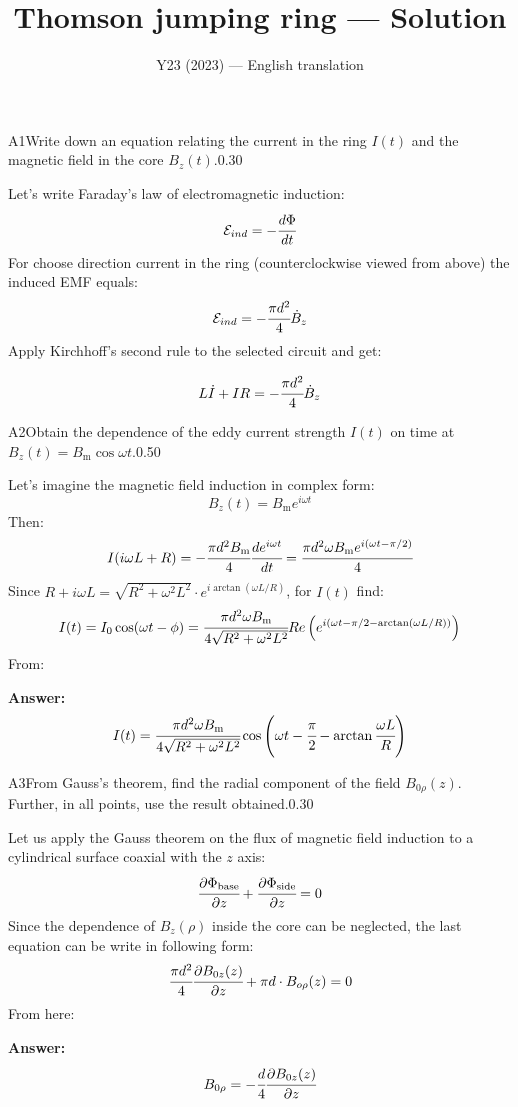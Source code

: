 \documentclass[11pt,a4paper]{article}
\title{\textbf{Thomson jumping ring --- Solution}}
\author{\normalsize Y23 (2023) — English translation}
\date{}
\begin{document}
\maketitle\vspace{-0.5em}
\begin{solcard}{A1}{Write down an equation relating the current in the ring $I(t)$ and the magnetic field in the core $B_z(t)$.}{0.30}

Let's write Faraday's law of electromagnetic induction: $$\mathcal{E}_{ind}=-\cfrac{d\Phi}{dt} $$For choose direction current in the ring (counterclockwise viewed from above) the induced EMF equals: $$\mathcal{E}_{ind}=-\cfrac{\pi{d}^2}{4}\dot{B}_z $$Apply Kirchhoff's second rule to the selected circuit and get:


$$L\dot{I}+IR=-\cfrac{\pi{d}^2}{4}\dot{B}_z $$

\end{solcard}

\begin{solcard}{A2}{Obtain the dependence of the eddy current strength $I(t)$ on time at $B_z(t)=B_\mathrm m\cos\omega t$.}{0.50}

Let's imagine the magnetic field induction in complex form: $$B_z(t)=B_\mathrm me^{i\omega t} $$Then: $$I(i\omega L+R)=-\cfrac{\pi{d}^2B_\mathrm m}{4}\cfrac{de^{i\omega t}}{dt}=\cfrac{\pi{d}^2\omega B_\mathrm me^{i(\omega t-\pi/2)}}{4} $$Since $R+i\omega L=\sqrt{R^2+\omega^2L^2}\cdot e^{i\arctan(\omega L/R)}$, for $I(t)$ find: $$I(t)=I_0\cos(\omega t-\phi)=\cfrac{\pi{d}^2\omega B_\mathrm m}{4\sqrt{R^2+\omega^2L^2}}Re\left(e^{i(\omega t-\pi/2-\arctan(\omega L/R))}\right) $$From:

\par\smallskip\noindent\textbf{Answer:} $$I(t)=\cfrac{\pi{d}^2\omega B_\mathrm m}{4\sqrt{R^2+\omega^2L^2}}\cos\left(\omega t-\cfrac{\pi}{2}-\arctan\cfrac{\omega L}{R}\right) $$
\end{solcard}

\begin{solcard}{A3}{From Gauss's theorem, find the radial component of the field $B_{0\rho}(z)$. Further, in all points, use the result obtained.}{0.30}

Let us apply the Gauss theorem on the flux of magnetic field induction to a cylindrical surface coaxial with the $z$ axis: $$\cfrac{\partial \Phi_\text{base}}{\partial z}+\cfrac{\partial \Phi_\text{side}}{\partial z}=0 $$Since the dependence of $B_z(\rho)$ inside the core can be neglected, the last equation can be write in following form: $$\cfrac{\pi{d}^2}{4}\cfrac{\partial B_{0z}(z)}{\partial z}+\pi d\cdot B_{o\rho}(z)=0 $$From here:

\par\smallskip\noindent\textbf{Answer:} $$B_{0\rho}=-\cfrac{d}{4}\cfrac{\partial B_{0z}(z)}{\partial z} $$
\end{solcard}
\end{document}
